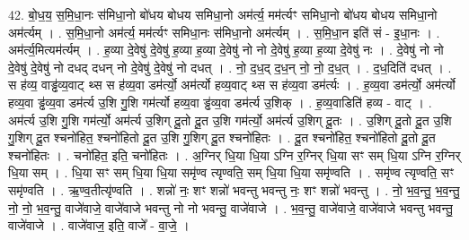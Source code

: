 \documentclass[17pt]{extarticle}
\begin{document}
42. बो॒ध॒य॒ स॒मि॒धा॒नः स॑मिधा॒नो बो॑धय बोधय समिधा॒नो अम॑र्त्य॒ मम॑र्त्यꣳ समिधा॒नो बो॑धय बोधय समिधा॒नो अम॑र्त्यम् । . स॒मि॒धा॒नो अम॑र्त्य॒ मम॑र्त्यꣳ समिधा॒नः स॑मिधा॒नो अम॑र्त्यम् । . स॒मि॒धा॒न इति॑ सं - इ॒धा॒नः । . अम॑र्त्य॒मित्यम॑र्त्यम् । . ह॒व्या दे॒वेषु॑ दे॒वेषु॑ ह॒व्या ह॒व्या दे॒वेषु॑ नो नो दे॒वेषु॑ ह॒व्या ह॒व्या दे॒वेषु॑ नः । . दे॒वेषु॑ नो नो दे॒वेषु॑ दे॒वेषु॑ नो दधद् दधन् नो दे॒वेषु॑ दे॒वेषु॑ नो दधत् । . नो॒ द॒ध॒द् द॒ध॒न् नो॒ नो॒ द॒ध॒त् । . द॒ध॒दिति॑ दधत् । . स ह॑व्य॒ वाड्ढ॑व्य॒वाट् थ्स स ह॑व्य॒वा डम॑र्त्यो॒ अम॑र्त्यो हव्य॒वाट् थ्स स ह॑व्य॒वा डम॑र्त्यः । . ह॒व्य॒वा डम॑र्त्यो॒ अम॑र्त्यो हव्य॒वा ड्ढ॑व्य॒वा डम॑र्त्य उ॒शि गु॒शि गम॑र्त्यो हव्य॒वा ड्ढ॑व्य॒वा डम॑र्त्य उ॒शिक् । . ह॒व्य॒वाडिति॑ हव्य - वाट् । . अम॑र्त्य उ॒शि गु॒शि गम॑र्त्यो॒ अम॑र्त्य उ॒शिग् दू॒तो दू॒त उ॒शि गम॑र्त्यो॒ अम॑र्त्य उ॒शिग् दू॒तः । . उ॒शिग् दू॒तो दू॒त उ॒शि गु॒शिग् दू॒त श्चनो॑हित॒ श्चनो॑हितो दू॒त उ॒शि गु॒शिग् दू॒त श्चनो॑हितः । . दू॒त श्चनो॑हित॒ श्चनो॑हितो दू॒तो दू॒त श्चनो॑हितः । . चनो॑हित॒ इति॒ चनो॑हितः । . अ॒ग्निर् धि॒या धि॒या ऽग्नि र॒ग्निर् धि॒या सꣳ सम् धि॒या ऽग्नि र॒ग्निर् धि॒या सम् । . धि॒या सꣳ सम् धि॒या धि॒या समृ॑ण्व त्यृण्वति॒ सम् धि॒या धि॒या समृ॑ण्वति । . समृ॑ण्व त्यृण्वति॒ सꣳ समृ॑ण्वति । . ऋ॒ण्व॒तीत्यृ॑ण्वति । . शन्नो॑ नः॒ शꣳ शन्नो॑ भवन्तु भवन्तु नः॒ शꣳ शन्नो॑ भवन्तु । . नो॒ भ॒व॒न्तु॒ भ॒व॒न्तु॒ नो॒ नो॒ भ॒व॒न्तु॒ वाजे॑वाजे॒ वाजे॑वाजे भवन्तु नो नो भवन्तु॒ वाजे॑वाजे । . भ॒व॒न्तु॒ वाजे॑वाजे॒ वाजे॑वाजे भवन्तु भवन्तु॒ वाजे॑वाजे । . वाजे॑वाज॒ इति॒ वाजे᳚ - वा॒जे॒ । \newline
\pagebreak
\end{document}
